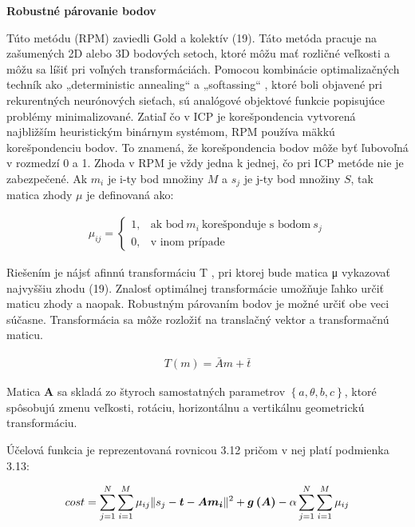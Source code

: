 \textbf{Robustné párovanie bodov}

Túto metódu (RPM) zaviedli Gold a kolektív (19). Táto metóda pracuje na zašumených 2D alebo 3D bodových setoch, ktoré môžu mať rozličné veľkosti a môžu sa líšiť pri voľných transformáciách. Pomocou kombinácie optimalizačných techník ako „deterministic annealing“ a „softassing“ , ktoré boli objavené pri rekurentných neurónových sieťach, sú analógové objektové funkcie popisujúce problémy minimalizované. Zatiaľ čo v ICP je korešpondencia vytvorená najbližším heuristickým binárnym systémom, RPM používa mäkkú korešpondenciu bodov. To znamená, že korešpondencia bodov môže byť ľubovoľná v rozmedzí 0 a 1. Zhoda v RPM je vždy jedna k jednej, čo pri ICP metóde nie je zabezpečené. Ak $m_i$ je i-ty bod množiny $M$ a $s_j$ je j-ty bod množiny $S$, tak matica zhody $\mu$ je definovaná ako:

\begin{equation}
\label{eq10}
\begin{aligned}
\mu_{ij}=
\begin{cases}
1, & \text{ak bod}\ m_i\ \text{korešponduje s bodom}\ s_j \\
0, & \text{v inom prípade}
\end{cases}
\end{aligned}
\end{equation}

Riešením je nájsť afinnú transformáciu T , pri ktorej bude matica μ vykazovať najvyššiu zhodu (19). Znalosť optimálnej transformácie umožňuje ľahko určiť maticu zhody a naopak. Robustným párovaním bodov je možné určiť obe veci súčasne. Transformácia sa môže rozložiť na translačný vektor a transformačnú maticu.

\begin{equation}
\label{eq11}
\begin{aligned}
T\left(m\right)=\bar{A}m+\bar{t}
\end{aligned}
\end{equation}

Matica \textbf{A} sa skladá zo štyroch samostatných parametrov $\left\lbrace a, \theta, b, c \right\rbrace$, ktoré spôsobujú zmenu veľkosti, rotáciu, horizontálnu a vertikálnu geometrickú transformáciu.

Účelová funkcia je reprezentovaná rovnicou 3.12 pričom v nej platí podmienka 3.13:

\begin{equation}
\label{eq12}
\begin{aligned}
cost=\sum_{j=1}^{N}\sum_{i=1}^{M} \mu_{ij} \Arrowvert s_j - \boldsymbol{t} - \boldsymbol{Am_i} \Arrowvert^2 + \boldsymbol{g\left(A\right)} -\alpha \sum_{j=1}^{N}\sum_{i=1}^{M} \mu_{ij}
\end{aligned}
\end{equation}

